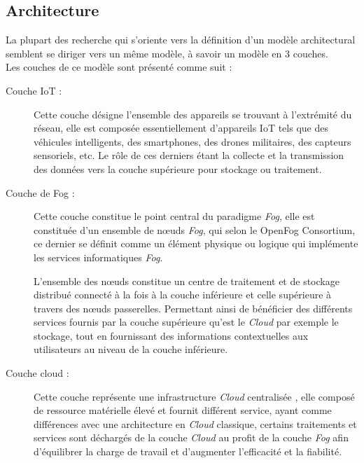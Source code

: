 \subsection{Architecture}
La plupart des recherche qui s'oriente vers la définition d'un modèle architectural semblent se diriger vers un même modèle, à savoir un modèle en 3 couches\cite{de2019}.\\
Les couches de ce modèle sont présenté comme suit :
\begin{description}
  \item[Couche IoT :] Cette couche désigne l'ensemble des appareils se trouvant à l'extrémité du réseau, elle est composée essentiellement d'appareils IoT tels que des véhicules intelligents, des smartphones, des drones militaires, des capteurs sensoriels, etc. Le rôle de ces derniers étant la collecte et la transmission des données vers la couche supérieure pour stockage ou traitement.
  \item[Couche de Fog :] Cette couche constitue le point central du paradigme \emph{Fog}, elle est constituée d'un ensemble de nœuds \emph{Fog}, qui selon le OpenFog Consortium, ce dernier se définit comme 
  \og{}un élément physique ou logique qui implémente les services informatiques \emph{Fog}\fg\cite{de2019}.\par
  L'ensemble des nœuds constitue un centre de traitement et de stockage distribué connecté à la fois à la couche inférieure et celle supérieure à travers des nœuds passerelles. Permettant ainsi de bénéficier des différents services fournis par la couche supérieure qu'est le \emph{Cloud} par exemple le stockage, tout en fournissant des informations contextuelles aux utilisateurs au niveau de la couche inférieure.
  \item[Couche cloud :] Cette couche représente une infrastructure \emph{Cloud} centralisée , elle composé de ressource matérielle élevé et fournit différent service, ayant comme différences avec une architecture en \emph{Cloud} classique, certains traitements et services sont déchargés de la couche \emph{Cloud} au profit de la couche \emph{Fog} afin d'équilibrer la charge de travail et d'augmenter l'efficacité et la fiabilité.
\end{description}
